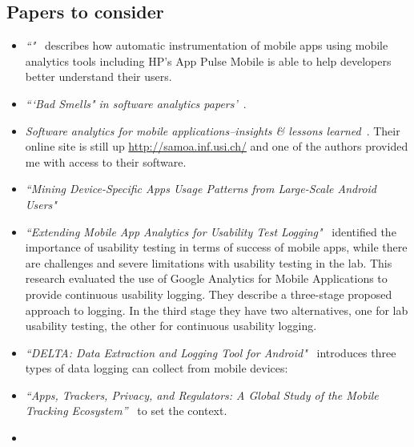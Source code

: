 \subsection{Papers to consider}
\begin{itemize}
    \item \emph{``"}~\citep{parate2016_RECKON_an_analytics_framework_for_app_developers_HP_AppPulseMobile} describes how automatic instrumentation of mobile apps using mobile analytics tools including HP's App Pulse Mobile is able to help developers better understand their users. 
    \item \emph{```Bad Smells" in software analytics papers'}~\citep{menzies2019_badsmells_in_software_analytics}.
    \item \emph{Software analytics for mobile applications--insights \& lessons learned}~\citep{minelli2013_software_analytics_samoa}. Their online site is still up \url{http://samoa.inf.usi.ch/} and one of the authors provided me with access to their software.
    \item \emph{``Mining Device-Specific Apps Usage Patterns from Large-Scale Android Users"}~\citep{li2017_mining_device_Specific_app_usage_patterns}
    \item \emph{``Extending Mobile App Analytics for Usability Test Logging"}~\citealt{ferre2017_extending_mobile_app_analytics_for_usability_test_logging} identified the importance of usability testing in terms of success of mobile apps, while there are challenges and severe limitations with usability testing in the lab. This research evaluated the use of Google Analytics for Mobile Applications to provide continuous usability logging. They describe a three-stage proposed approach to logging. In the third stage they have two alternatives, one for lab usability testing, the other for continuous usability logging. 
    \item \emph{``DELTA: Data Extraction and Logging Tool for Android"}~\citep{spolaor2018_delta_data_extraction_and_logging_tool_for_android} introduces three types of data logging can collect from mobile devices: 
    \item \emph{``Apps, Trackers, Privacy, and Regulators: A Global Study of the Mobile Tracking Ecosystem''}~\citep{razaghpanah2018_apps_trackers_privacy_and_regulators_a_global_study_of_the_mobile_tracking_ecosystem} to set the context.
    \item \citet{liu2020_privacy_risk_analysis_and_mitigation_of_analytics_libraries_in_the_android_ecosystem}
\end{itemize}

